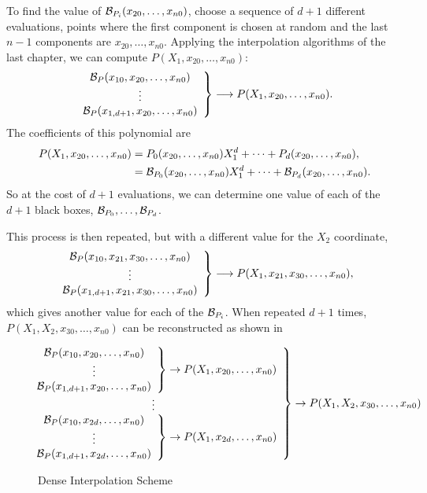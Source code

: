To find the value of ${\cal B}_{P_i}(x_{20}, \ldots, x_{n0})$, choose
a sequence of $d+1$ different evaluations, points where the first
component is chosen at random and the last $n-1$ components are
$x_{20}, \ldots, x_{n0}$.  Applying the interpolation algorithms of
the last chapter, we can compute $P(X_1, x_{20}, \ldots, x_{n0})$:
\[
\left.
\begin{array}{c}
{\cal B}_P(x_{10}, x_{20}, \ldots, x_{n0}) \\ \vdots \\
{\cal B}_P(x_{1,d+1}, x_{20}, \ldots, x_{n0})
\end{array} \right\} \longrightarrow P(X_1, x_{20}, \ldots, x_{n0}).
\]
The coefficients of this polynomial are
\[
\begin{aligned}
P(X_1, x_{20}, \ldots, x_{n0}) 
   & = P_0(x_{20}, \ldots, x_{n0}) X_1^d + \cdots + P_d(x_{20}, \ldots, x_{n0}), \\
   & = {\cal B}_{P_0}(x_{20}, \ldots, x_{n0}) X_1^d + \cdots 
     + {\cal B}_{P_d}(x_{20}, \ldots, x_{n0}).
\end{aligned}
\]
So at the cost of $d+1$ evaluations, we can determine one value of
each of the $d+1$ black boxes, ${\cal B}_{P_0}, \ldots, {\cal B}_{P_d}$. 

This process is then repeated, but with a different value for the $X_2$
coordinate,
\[
\left.
\begin{array}{c}
{\cal B}_P(x_{10}, x_{21}, x_{30}, \ldots, x_{n0}) \\ \vdots \\
{\cal B}_P(x_{1,d+1}, x_{21}, x_{30}, \ldots, x_{n0})
\end{array} \right\} \longrightarrow P(X_1, x_{21}, x_{30}, \ldots, x_{n0}),
\]
which gives another value for each of the ${\cal B}_{P_i}$.  When
repeated $d+1$ times, $P(X_1, X_2, x_{30}, \ldots, x_{n0})$ can be
reconstructed as shown in 

\begin{figure}
\small
\[
\hspace*{-14pt}\left.
\begin{array}{c}
\left.
\begin{array}{c}
{\cal B}_P(x_{10}, x_{20}, \ldots, x_{n0}) \\ \vdots \\
{\cal B}_P(x_{1,d+1}, x_{20}, \ldots, x_{n0})
\end{array} \right\} \rightarrow P(X_1, x_{20}, \ldots, x_{n0})\\
\vdots \\
\left.
\begin{array}{c}
{\cal B}_P(x_{10}, x_{2d}, \ldots, x_{n0}) \\ \vdots \\
{\cal B}_P(x_{1,d+1}, x_{2d}, \ldots, x_{n0})
\end{array} \right\} \rightarrow P(X_1, x_{2d}, \ldots, x_{n0})
\end{array} \right\}
\rightarrow P(X_1, X_2, x_{30}, \ldots, x_{n0})
\]
\normalsize
\caption{Dense Interpolation Scheme\label{SI:DenseAlg:Fig}}
\end{figure}

